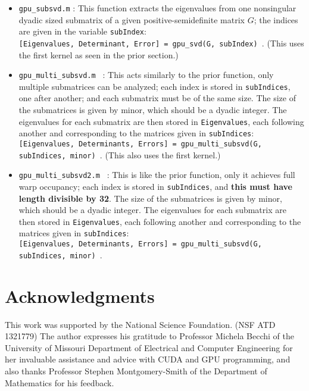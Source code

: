 \documentclass{amsart}
\begin{document}
\begin{itemize}
\item {\tt gpu\_subsvd.m} :  This function extracts the eigenvalues from one nonsingular dyadic sized submatrix of a given positive-semidefinite matrix $G$;  the indices are given in the variable {\tt subIndex}:  \\  {\tt [Eigenvalues, Determinant, Error] = gpu\_svd(G, subIndex) }.  (This uses the first kernel as seen in the prior section.)
\item {\tt gpu\_multi\_subsvd.m }  :  This acts similarly to the prior function, only multiple submatrices can be analyzed;  each index is stored in {\tt subIndices}, one after another;  and each submatrix must be of the same size.  The size of the submatrices is given by minor, which should be a dyadic integer.  The eigenvalues for each submatrix are then stored in {\tt Eigenvalues}, each following another and corresponding to the matrices given in {\tt subIndices}: \\
{\tt [Eigenvalues, Determinants, Errors] = gpu\_multi\_subsvd(G, subIndices, minor) }.  (This also uses the first kernel.)
\item {\tt gpu\_multi\_subsvd2.m }  :  This is like the prior function, only it achieves full warp occupancy;  each index is stored in {\tt subIndices}, and \textbf{this must have length divisible by 32}.  The size of the submatrices is given by minor, which should be a dyadic integer.  The eigenvalues for each submatrix are then stored in {\tt Eigenvalues}, each following another and corresponding to the matrices given in {\tt subIndices}: \\
{\tt [Eigenvalues, Determinants, Errors] = gpu\_multi\_subsvd(G, subIndices, minor) }.  

\end{itemize}


\section*{Acknowledgments}

\noindent
This work was supported by the National Science Foundation.  (NSF ATD 1321779)  The author expresses his gratitude to Professor Michela Becchi of the University of Missouri Department of Electrical and Computer Engineering for her invaluable assistance and advice with CUDA and GPU programming, and also thanks Professor Stephen Montgomery-Smith of the Department of Mathematics for his feedback.

\end{document}
